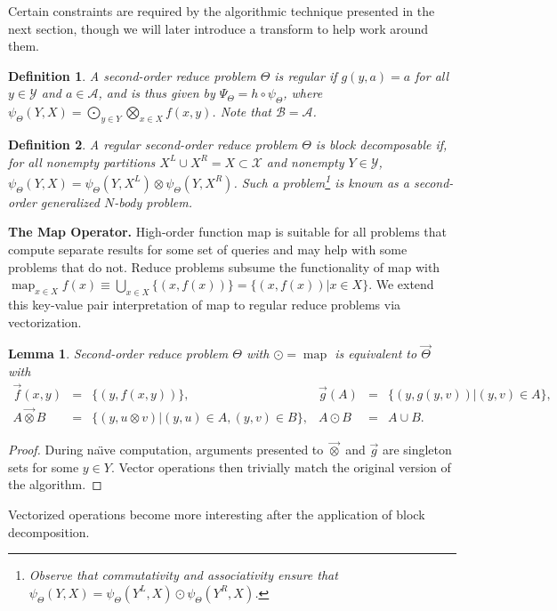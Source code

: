 \documentclass{article}
\newtheorem{lemma}{Lemma}
\newtheorem{definition} {Definition}
\newcommand{\GNP}[1][\psi]{{#1}_{\Theta}}
\newcommand{\otimesvec}{\mathbin{\overrightarrow{\otimes}}}
\DeclareMathOperator*{\map}{map}
\newcommand{\comp}{\mathbin{\circ}}
\begin{document}
Certain constraints are required by the algorithmic technique
presented in the next section, though we will later introduce a
transform to help work around them.
\begin{definition}
  A second-order reduce problem $\Theta$ is {\em regular} if $g(y,a) =
  a$ for all $y \in \mathcal{Y}$ and $a \in \mathcal{A}$, and is thus
  given by $\Psi_{\Theta} = h \comp \psi_{\Theta}$, where
  $\psi_{\Theta}(Y,X) = \bigodot_{y \in Y} \bigotimes_{x \in X}
  f(x,y)$.  Note that $\mathcal{B} = \mathcal{A}$.
\end{definition}
\begin{definition}
  A regular second-order reduce problem $\Theta$ is {\em block
  decomposable} if, for all nonempty partitions $X^{\!L} \cup X^{\!R} = X
  \subset \mathcal{X}$ and nonempty $Y \in \mathcal{Y}$, $\GNP(Y,X) =
  \GNP(Y,X^{\!L}) \otimes \GNP(Y,X^{\!R})$.  Such a problem\footnote{Observe
  that commutativity and associativity ensure that $\GNP(Y,X) =
  \GNP(Y^{\!L},X) \odot \GNP(Y^{\!R},X)$.} is known as a {\em second-order
  generalized $N$-body problem}.
\end{definition}


{\bf The Map Operator.}  High-order function map is suitable for all
problems that compute separate results for some set of queries and may
help with some problems that do not.  Reduce problems subsume the
functionality of map with $\map_{x \in X} f(x) \equiv \bigcup_{x \in
X} \{(x,f(x))\} = \{(x,f(x)) | x \in X\}$.  We extend this key-value
pair interpretation of map to regular reduce problems via
vectorization.
\begin{lemma}
  Second-order reduce problem $\Theta$ with $\odot = \map$ is
  equivalent to $\overrightarrow{\Theta}$ with
  \[ \begin{array}{rclrcl}
    \overrightarrow{f}(x,y) & = & \{(y, f(x,y))\}, & \overrightarrow{g}(A) & = & \{(y, g(y,v)) | (y,v) \in A\}, \\
    A \otimesvec B & = & \{(y, u \otimes v) | (y,u) \in A, (y,v) \in B\}, & A \odot B & = & A \cup B.
  \end{array} \]
\end{lemma}
\begin{proof}
  During na\"{\i}ve computation, arguments presented to $\otimesvec$
  and $\overrightarrow{g}$ are singleton sets for some $y \in Y$.
  Vector operations then trivially match the original version of the
  algorithm.
\end{proof}
\noindent Vectorized operations become more interesting after the
application of block decomposition.
\end{document}
